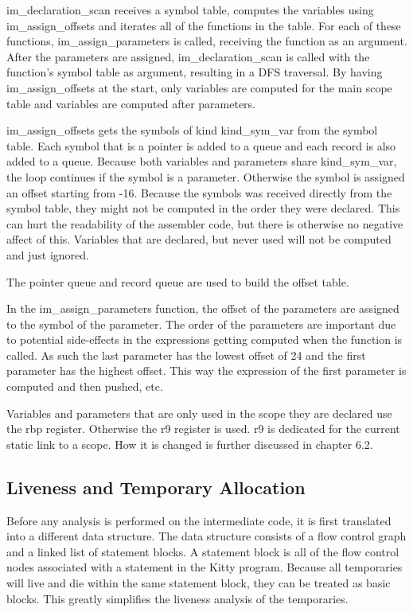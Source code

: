 \documentclass{article}
\begin{document}
im\_declaration\_scan receives a symbol table, computes the variables using im\_assign\_offsets and iterates all of the functions in the table. For each of these functions, im\_assign\_parameters is called, receiving the function as an argument. After the parameters are assigned, im\_declaration\_scan is called with the function's symbol table as argument, resulting in a DFS traversal. By having im\_assign\_offsets at the start, only variables are computed for the main scope table and variables are computed after parameters. 

im\_assign\_offsets gets the symbols of kind kind\_sym\_var from the symbol table. Each symbol that is a pointer is added to a queue and each record is also added to a queue. Because both variables and parameters share kind\_sym\_var, the loop continues if the symbol is a parameter. Otherwise the symbol is assigned an offset starting from -16. Because the symbols was received directly from the symbol table, they might not be computed in the order they were declared. This can hurt the readability of the assembler code, but there is otherwise no negative affect of this.
Variables that are declared, but never used will not be computed and just ignored.

The pointer queue and record queue are used to build the offset table.

In the im\_assign\_parameters function, the offset of the parameters are assigned to the symbol of the parameter. The order of the parameters are important due to potential side-effects in the expressions getting computed when the function is called. As such the last parameter has the lowest offset of 24 and the first parameter has the highest offset. This way the expression of the first parameter is computed and then pushed, etc.

Variables and parameters that are only used in the scope they are declared use the rbp register. Otherwise the r9 register is used. r9 is dedicated for the current static link to a scope. How it is changed is further discussed in chapter 6.2.

\subsection{Liveness and Temporary Allocation}

Before any analysis is performed on the intermediate code, it is first translated into a different data structure. The data structure consists of a flow control graph and a linked list of statement blocks. A statement block is all of the flow control nodes associated with a statement in the Kitty program. Because all temporaries will live and die within the same statement block, they can be treated as basic blocks. This greatly simplifies the liveness analysis of the temporaries. 
\end{document}
